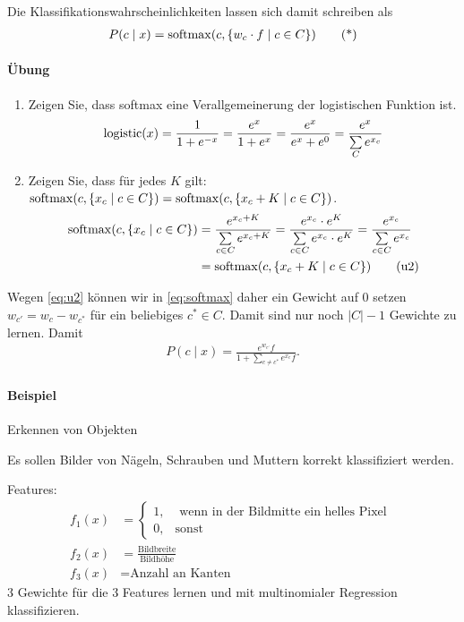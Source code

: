 Die Klassifikationswahrscheinlichkeiten lassen sich damit schreiben als
\begin{align*}
    P(c\mid x)=\operatorname*{softmax}(c,\{w_c\cdot f \mid c\in C\})
    \tag{*}\label{eq:softmax}
\end{align*}

\begin{shaded}
\paragraph{Übung}
\label{par:ubungsm}
\begin{enumerate}
    \item Zeigen Sie, dass softmax eine Verallgemeinerung der logistischen
        Funktion ist.
    \begin{align*}
        \operatorname*{logistic}(x)=\frac{1}{1+e^{-x}}=\frac{e^x}{1+e^x}=\frac{e^x}{e^x+e^0}=\frac{e^x}{\sum\limits_C
        e^{x_c}}
    \end{align*}
    \item Zeigen Sie, dass für jedes $K$ gilt: $\operatorname*{softmax}(c,\{x_c\mid c\in
        C\})=\operatorname*{softmax}(c,\{x_c+K\mid c\in C\})$.
        \begin{align*}
            \operatorname*{softmax}(c,\{x_c\mid c\in C\}) &= \frac{e^{x_c+K}}{\sum\limits_{c\in
                    C}e^{x_c+K}} = \frac{e^{x_c}\cdot e^K}{\sum\limits_{c\in
                    C}e^{x_c}\cdot e^K}=\frac{e^{x_c}}{\sum\limits_{c\in
                    C}e^{x_c}}\\ 
            &= \operatorname*{softmax}(c,\{x_c+K\mid c\in C\}) \tag{u2}\label{eq:u2}
        \end{align*}
\end{enumerate}
\end{shaded}
Wegen \cref{eq:u2} können wir in \cref{eq:softmax} daher ein Gewicht auf 0
setzen $w_{c'}=w_c-w_{c^*}$ für ein beliebiges $c^*\in C$. Damit sind nur noch
$|C|-1$ Gewichte zu lernen. Damit
\begin{align*}
    P(c\mid x)=\frac{e^{w_{c'}}f}{1+\sum\limits_{c\neq c^*}e^{x_c}f}.
\end{align*}

\begin{shaded}
\paragraph{Beispiel}
\label{par:beispielsw}
Erkennen von Objekten

Es sollen Bilder von Nägeln, Schrauben und Muttern korrekt klassifiziert werden.

Features:
\begin{align*}
    f_1(x)&=\begin{cases}1, & \text{ wenn in der Bildmitte ein helles Pixel }\\
        0, & \text{sonst} \end{cases}\\
    f_2(x)&=\frac{\text{Bildbreite}}{\text{Bildhöhe}}\\
    f_3(x)&=\text{Anzahl an Kanten}
\end{align*}
3 Gewichte für die 3 Features lernen und mit multinomialer Regression
klassifizieren.
\end{shaded}

